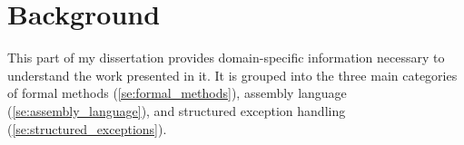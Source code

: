\chapter{Background}\label{ch:background}
This part of my dissertation provides domain-specific information
necessary to understand the work presented in it.
It is grouped into the three main categories of
formal methods (\cref{se:formal_methods}),
assembly language (\cref{se:assembly_language}),
and structured exception handling (\cref{se:structured_exceptions}).


%
%
